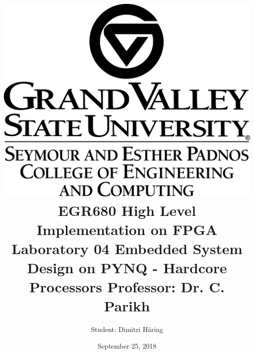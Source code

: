 \documentclass[]{article}
\title{ \includegraphics[scale=0.2]{01_images/gvsu_logo_marktop_SEPCEC_K_R.png}
		\linebreak 	\linebreak \linebreak
		EGR680 High Level Implementation on FPGA
		\linebreak \linebreak 
		Laboratory 04
		\linebreak \linebreak 
		Embedded System Design on PYNQ - Hardcore Processors
		\linebreak \linebreak \linebreak
		Professor: Dr. C. Parikh
		}
\author{Student: Dimitri Häring } %
\date{September 25, 2018}
\begin{document}
\maketitle
\newpage

\tableofcontents
\pagebreak



 

\printbibliography
\end{document}
